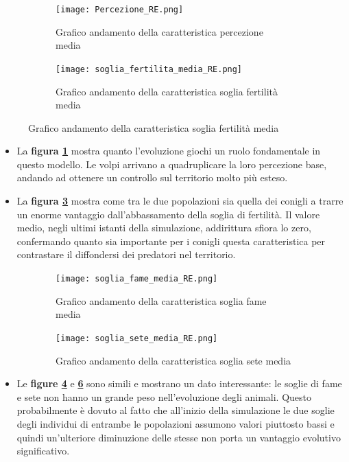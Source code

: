 \documentclass[11pt]{article}
\begin{document}
\begin{figure}[h!]
	\begin{subfigure}{\textwidth}
         \centering
         \texttt{[image: Percezione\_RE.png]}
         \caption{Grafico andamento della caratteristica percezione media}
         \label{fig:percezioneRE}
	\end{subfigure}
	\begin{subfigure}{\textwidth}
		\centering
        \texttt{[image: soglia\_fertilita\_media\_RE.png]}
        \caption{Grafico andamento della caratteristica soglia fertilità media}
        \label{fig:fertilitaRE}
	\end{subfigure}
\end{figure}

\begin{itemize}


    \item La \textbf{figura \ref{fig:percezioneRE}} mostra quanto l'evoluzione giochi un ruolo fondamentale in questo modello. Le volpi arrivano a quadruplicare la loro percezione base, andando ad ottenere un controllo sul territorio molto più esteso.

    \item La \textbf{figura \ref{fig:fertilitaRE}} mostra come tra le due popolazioni sia quella dei conigli a trarre un enorme vantaggio dall'abbassamento della soglia di fertilità. Il valore medio, negli ultimi istanti della simulazione, addirittura sfiora lo zero, confermando quanto sia importante per i conigli questa caratteristica per contrastare il diffondersi dei predatori nel territorio. 
\end{itemize}

\newpage

\begin{figure}[h!]
	\begin{subfigure}{\textwidth}
         \centering
         \texttt{[image: soglia\_fame\_media\_RE.png]}
         \caption{Grafico andamento della caratteristica soglia fame media}
         \label{fig:FameRE}
	\end{subfigure}
	\begin{subfigure}{\textwidth}
		\centering
        \texttt{[image: soglia\_sete\_media\_RE.png]}
        \caption{Grafico andamento della caratteristica soglia sete media}
        \label{fig:SeteRE}
	\end{subfigure}
	\caption{}
\end{figure}

\begin{itemize}


    \item Le \textbf{figure \ref{fig:FameRE}} e \textbf{\ref{fig:SeteRE}} sono simili e mostrano un dato interessante: le soglie di fame e sete non hanno un grande peso nell'evoluzione degli animali. Questo probabilmente è dovuto al fatto che all'inizio della simulazione le due soglie degli individui di entrambe le popolazioni assumono valori piuttosto bassi e quindi un'ulteriore diminuzione delle stesse non porta un vantaggio evolutivo significativo.
\end{itemize}
\end{document}
